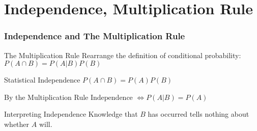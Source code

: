 \section{Independence, Multiplication Rule}
\begin{frame}
\frametitle{Independence and The Multiplication Rule}
\begin{block}{The Multiplication Rule}
Rearrange the definition of conditional probability:
$P(A\cap B) = P(A|B)P(B)$
\end{block}\pause
\begin{block}{Statistical Independence}
$P(A\cap B) = P(A)P(B)$
\end{block}\pause
\begin{alertblock}{By the Multiplication Rule}
$\mbox{Independence } \iff P(A|B) = P(A)$\\
\end{alertblock}\pause
\begin{block}{Interpreting Independence}
Knowledge that $B$ has occurred tells nothing about whether $A$ will.
\end{block}
\end{frame}

